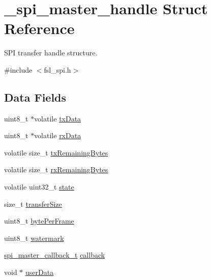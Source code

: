 \hypertarget{struct__spi__master__handle}{}\section{\+\_\+spi\+\_\+master\+\_\+handle Struct Reference}
\label{struct__spi__master__handle}


S\+PI transfer handle structure.  




{\ttfamily \#include $<$fsl\+\_\+spi.\+h$>$}

\subsection*{Data Fields}
\begin{DoxyCompactItemize}
\item 
uint8\+\_\+t $\ast$volatile \mbox{\hyperlink{struct__spi__master__handle_ab56d8f300582ce9d7f4a79729124739d}{tx\+Data}}
\item 
uint8\+\_\+t $\ast$volatile \mbox{\hyperlink{struct__spi__master__handle_aa58335de5bfa8923228432b62ea9308a}{rx\+Data}}
\item 
volatile size\+\_\+t \mbox{\hyperlink{struct__spi__master__handle_a554cc5b5619072f7256a7f7cc1f2bcdb}{tx\+Remaining\+Bytes}}
\item 
volatile size\+\_\+t \mbox{\hyperlink{struct__spi__master__handle_aa7189218ccadddcc71ad7de6b758f01a}{rx\+Remaining\+Bytes}}
\item 
volatile uint32\+\_\+t \mbox{\hyperlink{struct__spi__master__handle_a47e491dc6b16e7a86f4396620f4bb704}{state}}
\item 
size\+\_\+t \mbox{\hyperlink{struct__spi__master__handle_a10e6d1f095e525fa85ffe957081ed7a7}{transfer\+Size}}
\item 
uint8\+\_\+t \mbox{\hyperlink{struct__spi__master__handle_a91e259e32d8fb8a07db35bb933c2b6a4}{byte\+Per\+Frame}}
\item 
uint8\+\_\+t \mbox{\hyperlink{struct__spi__master__handle_a3585201b190b39d2d702daa9192323a3}{watermark}}
\item 
\mbox{\hyperlink{group__spi__driver_ga75d9df6e4614756d8ff1bd6f86ca2235}{spi\+\_\+master\+\_\+callback\+\_\+t}} \mbox{\hyperlink{struct__spi__master__handle_a080452bbb72856f9fc2e834d6537d9ff}{callback}}
\item 
void $\ast$ \mbox{\hyperlink{struct__spi__master__handle_a2e294dd14122c554baa0665072b4ca7a}{user\+Data}}
\end{DoxyCompactItemize}



